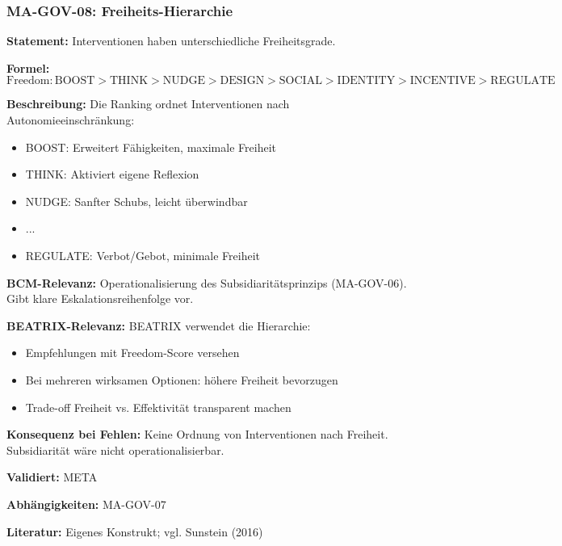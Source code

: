 \subsubsection*{MA-GOV-08: Freiheits-Hierarchie}

\textbf{Statement:} Interventionen haben unterschiedliche Freiheitsgrade.

\textbf{Formel:}
\begin{equation}
\text{Freedom}: \text{BOOST} > \text{THINK} > \text{NUDGE} > \text{DESIGN} > \text{SOCIAL} > \text{IDENTITY} > \text{INCENTIVE} > \text{REGULATE}
\end{equation}

\textbf{Beschreibung:}
Die Ranking ordnet Interventionen nach Autonomieeinschränkung:
\begin{itemize}
    \item BOOST: Erweitert Fähigkeiten, maximale Freiheit
    \item THINK: Aktiviert eigene Reflexion
    \item NUDGE: Sanfter Schubs, leicht überwindbar
    \item ...
    \item REGULATE: Verbot/Gebot, minimale Freiheit
\end{itemize}

\textbf{BCM-Relevanz:}
Operationalisierung des Subsidiaritätsprinzips (MA-GOV-06). Gibt klare Eskalationsreihenfolge vor.

\textbf{BEATRIX-Relevanz:}
BEATRIX verwendet die Hierarchie:
\begin{itemize}
    \item Empfehlungen mit Freedom-Score versehen
    \item Bei mehreren wirksamen Optionen: höhere Freiheit bevorzugen
    \item Trade-off Freiheit vs. Effektivität transparent machen
\end{itemize}

\textbf{Konsequenz bei Fehlen:}
Keine Ordnung von Interventionen nach Freiheit. Subsidiarität wäre nicht operationalisierbar.

\textbf{Validiert:} META

\textbf{Abhängigkeiten:} MA-GOV-07

\textbf{Literatur:} Eigenes Konstrukt; vgl. Sunstein (2016)


